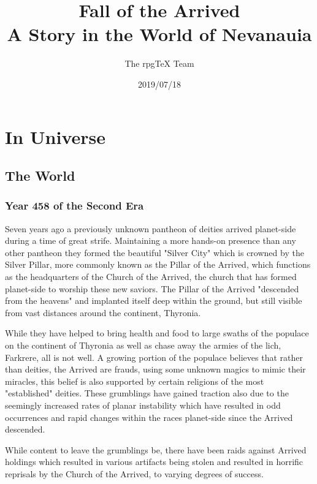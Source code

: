 \documentclass[letterpaper,twocolumn,openany,nodeprecatedcode]{dndbook}
\title{Fall of the Arrived \\
\large A Story in the World of Nevanauia}
\author{The rpgTeX Team}
\date{2019/07/18}
\begin{document}
\frontmatter

\maketitle

\tableofcontents

\mainmatter%


\part{In Universe}

\chapter{The World}

\section{Year 458 of the Second Era}

Seven years ago a previously unknown pantheon of deities arrived planet-side during a time of great strife. Maintaining a more hands-on presence than any other pantheon they formed the beautiful "Silver City" which is crowned by the Silver Pillar, more commonly known as the Pillar of the Arrived, which functions as the headquarters of the Church of the Arrived, the church that has formed planet-side to worship these new saviors. The Pillar of the Arrived "descended from the heavens" and implanted itself deep within the ground, but still visible from vast distances around the continent, Thyronia.


While they have helped to bring health and food to large swaths of the populace on the continent of Thyronia as well as chase away the armies of the lich, Farkrere, all is not well. A growing portion of the populace believes that rather than deities, the Arrived are frauds, using some unknown magics to mimic their miracles, this belief is also supported by certain religions of the most "established" deities. These grumblings have gained traction also due to the seemingly increased rates of planar instability which have resulted in odd occurrences and rapid changes within the races planet-side since the Arrived descended.


While content to leave the grumblings be, there have been raids against Arrived holdings which resulted in various artifacts being stolen and resulted in horrific reprisals by the Church of the Arrived, to varying degrees of success.
\end{document}
